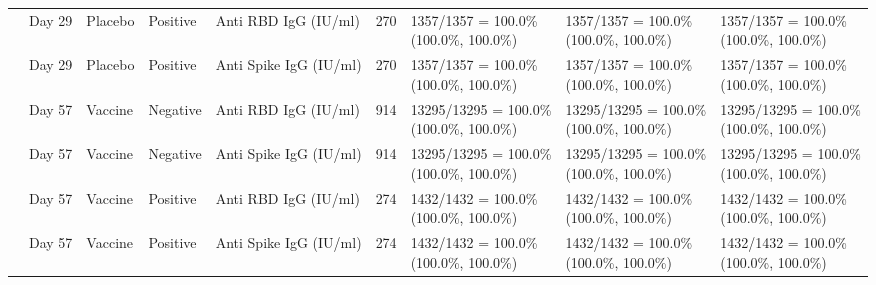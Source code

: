 \documentclass[]{book}
\theoremstyle{definition}
\theoremstyle{definition}
\theoremstyle{definition}
\newcommand{\1}{\mathbbm{1}}
\begin{document}
\begin{landscape}
\begin{ThreePartTable}
\begin{longtable}[t]{>{\raggedright\arraybackslash}p{2.7cm}llllllll}
\hspace{1em} & Day 29 & Placebo & Positive & Anti RBD IgG (IU/ml) & 270 & \makecell[l]{1357/1357 = 100.0\%\\(100.0\%, 100.0\%)} & \makecell[l]{1357/1357 = 100.0\%\\(100.0\%, 100.0\%)} & \makecell[l]{1357/1357 = 100.0\%\\(100.0\%, 100.0\%)}\\
\hspace{1em} & Day 29 & Placebo & Positive & Anti Spike IgG (IU/ml) & 270 & \makecell[l]{1357/1357 = 100.0\%\\(100.0\%, 100.0\%)} & \makecell[l]{1357/1357 = 100.0\%\\(100.0\%, 100.0\%)} & \makecell[l]{1357/1357 = 100.0\%\\(100.0\%, 100.0\%)}\\
\hspace{1em} & Day 57 & Vaccine & Negative & Anti RBD IgG (IU/ml) & 914 & \makecell[l]{13295/13295 = 100.0\%\\(100.0\%, 100.0\%)} & \makecell[l]{13295/13295 = 100.0\%\\(100.0\%, 100.0\%)} & \makecell[l]{13295/13295 = 100.0\%\\(100.0\%, 100.0\%)}\\
\hspace{1em} & Day 57 & Vaccine & Negative & Anti Spike IgG (IU/ml) & 914 & \makecell[l]{13295/13295 = 100.0\%\\(100.0\%, 100.0\%)} & \makecell[l]{13295/13295 = 100.0\%\\(100.0\%, 100.0\%)} & \makecell[l]{13295/13295 = 100.0\%\\(100.0\%, 100.0\%)}\\
\hspace{1em} & Day 57 & Vaccine & Positive & Anti RBD IgG (IU/ml) & 274 & \makecell[l]{1432/1432 = 100.0\%\\(100.0\%, 100.0\%)} & \makecell[l]{1432/1432 = 100.0\%\\(100.0\%, 100.0\%)} & \makecell[l]{1432/1432 = 100.0\%\\(100.0\%, 100.0\%)}\\
\hspace{1em} & Day 57 & Vaccine & Positive & Anti Spike IgG (IU/ml) & 274 & \makecell[l]{1432/1432 = 100.0\%\\(100.0\%, 100.0\%)} & \makecell[l]{1432/1432 = 100.0\%\\(100.0\%, 100.0\%)} & \makecell[l]{1432/1432 = 100.0\%\\(100.0\%, 100.0\%)}\\

\end{longtable}
\end{ThreePartTable}
\end{landscape}
\end{document}
